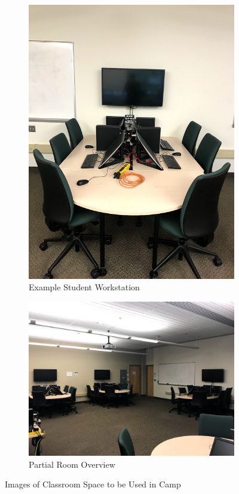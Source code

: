 \documentclass[12pt]{article}
\begin{document}
\begin{figure}[h]
\centering
\begin{subfigure}{.5\textwidth}
  \centering
  \includegraphics[scale=0.30]{images/1650Table.jpg}
   	\caption{Example Student Workstation}
   	\label{fig:RITResearchComputing}
\end{subfigure}%
\begin{subfigure}{.5\textwidth}
  \centering
 \includegraphics[scale=0.27]{images/1650Room.jpg}
    	\caption{Partial Room Overview}
   	\label{fig:RITDroneCage}
\end{subfigure}
\caption{Images of Classroom Space to be Used in Camp}
\label{fig:RITFacilities}
\end{figure}
\end{document}

